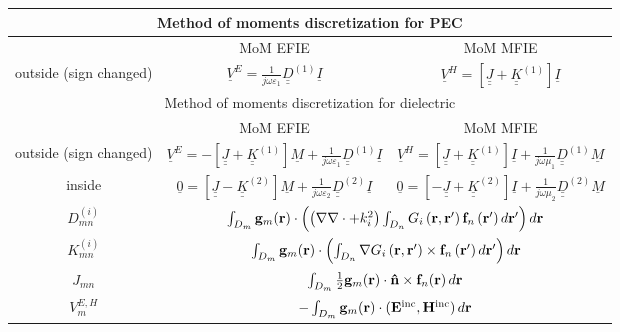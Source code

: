 \begin{table}[h!]
\centering
\begin{tabular}{|c||c|c|}
  \hline
  \multicolumn{3}{|c|}{Method of moments discretization for PEC} \\
  \hline
  \hline
   & MoM EFIE & MoM MFIE \\
  \hline
  outside (sign changed) & $\underline{V}^E =  \frac{1}{j \omega \varepsilon_1}  \underline{\underline{D}}^{(1)} \underline{I}$ & $\underline{V}^H =  \left[\underline{\underline{J}} + \underline{\underline{K}}^{(1)} \right] \underline{I}$ \\
  \hline
  \hline
  \multicolumn{3}{|c|}{Method of moments discretization for dielectric} \\
  \hline
  \hline
   & MoM EFIE & MoM MFIE \\
  \hline
  outside (sign changed) & $\underline{V}^E =  -\left[\underline{\underline{J}} + \underline{\underline{K}}^{(1)} \right] \underline{M} + \frac{1}{j \omega \varepsilon_1}  \underline{\underline{D}}^{(1)} \underline{I}$ & $\underline{V}^H =  \left[\underline{\underline{J}} + \underline{\underline{K}}^{(1)} \right] \underline{I} + \frac{1}{j \omega \mu_1}  \underline{\underline{D}}^{(1)} \underline{M}$ \\
  \hline
  inside  & $\underline{0} =  \left[\underline{\underline{J}} - \underline{\underline{K}}^{(2)} \right] \underline{M} + \frac{1}{j \omega \varepsilon_2}  \underline{\underline{D}}^{(2)} \underline{I}$ & $\underline{0} =  \left[-\underline{\underline{J}} + \underline{\underline{K}}^{(2)} \right] \underline{I} + \frac{1}{j \omega \mu_2}  \underline{\underline{D}}^{(2)} \underline{M}$ \\
  \hline
  \hline
$D_{mn}^{(i)}$ & \multicolumn{2}{|c|}{$\int_{D_m}\mathbf{g}_m \!\left(\mathbf{r}\right) \cdot \left( \left(\nabla \nabla \cdot + k_i^2\right) \int_{D_n} G_i\left(\mathbf{r}, \mathbf{r}'\right) \mathbf{f}_n\left(\mathbf{r}'\right) d\mathbf{r}' \right) d\mathbf{r}$} \\
\hline
 $K_{mn}^{(i)}$ & \multicolumn{2}{|c|}{$\int_{D_m} \mathbf{g}_m \!\left(\mathbf{r}\right) \cdot \left(\int_{D_n} \nabla G_i\left(\mathbf{r}, \mathbf{r}'\right) \times \mathbf{f}_n\left(\mathbf{r}'\right) d\mathbf{r}'\right) d\mathbf{r}$} \\
  \hline
$J_{mn}$ & \multicolumn{2}{|c|}{$\int_{D_m} \frac{1}{2} \mathbf{g}_m \!\left(\mathbf{r}\right) \cdot \mathbf{\hat{n}} \times \mathbf{f}_{n}\!\left(\mathbf{r}\right)d\mathbf{r}$} \\
  \hline
$V_m^{E,H}$ & \multicolumn{2}{|c|}{$-\int_{D_m}\mathbf{g}_m \!\left(\mathbf{r}\right) \cdot \left(\mathbf{E}^\text{inc},\mathbf{H}^\text{inc}\right) d\mathbf{r}$} \\
\hline
\end{tabular}
\end{table}

